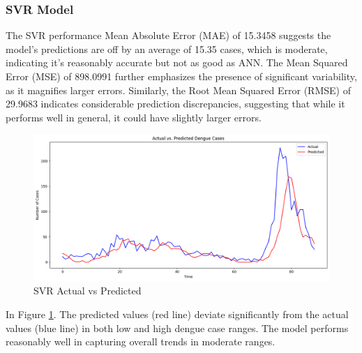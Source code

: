 \documentclass{article}
\begin{document}
\subsubsection{SVR Model}
The SVR performance Mean Absolute Error (MAE) of 15.3458 suggests the model's predictions are off by an average of 15.35 cases, which is moderate, indicating it’s reasonably accurate but not as good as ANN. The Mean Squared Error (MSE) of 898.0991 further emphasizes the presence of significant variability, as it magnifies larger errors. Similarly, the Root Mean Squared Error (RMSE) of 29.9683 indicates considerable prediction discrepancies, suggesting that while it performs well in general, it could have slightly larger errors.
\begin{figure}[h!]
    \centering
    \includegraphics[width=1\linewidth]{image/svr plot.png}
    \caption{SVR Actual vs Predicted}
    \label{fig:svr}
\end{figure}

In Figure \ref{fig:svr}. The predicted values (red line) deviate significantly from the actual values (blue line) in both low and high dengue case ranges. The model performs reasonably well in capturing overall trends in moderate ranges.
\end{document}
